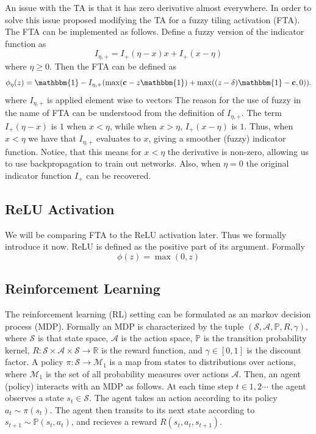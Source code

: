 \documentclass{article}
\newcommand{\RR}{\mathbb{R}}
\newcommand{\PP}{\mathbb{P}}
\newcommand{\cS}{\mathcal{S}}
\newcommand{\cA}{\mathcal{A}}
\newcommand{\cM}{\mathcal{M}}
\begin{document}
An issue with the TA is that it has zero derivative almost everywhere.
In order to solve this issue \cite{pan2019fuzzy} proposed modifying the TA for a fuzzy tiling activation (FTA).
The FTA can be implemented as follows.
Define a fuzzy version of the indicator function as
$$I_{\eta, +} = I_+(\eta -x)x + I_+(x - \eta)$$
where $\eta \ge 0$.
Then the FTA can be defined as
$$\phi_\eta(z) = \mathbbm{1} - I_{\eta, +} (\max(\mathbf{c} - z \mathbbm{1}) + \max((z-\delta)\mathbbm{1} - \mathbf{c}, 0)).$$
where $I_{\eta, +}$ is applied element wise to vectors
The reason for the use of fuzzy in the name of FTA can be understood from the definition of $I_{\eta, +}$.
The term $I_+(\eta -x)$ is $1$ when $x < \eta$, while when $x > \eta$, $I_+(x - \eta)$ is $1$.
Thus, when $x < \eta$ we have that $I_{\eta ,+}$ evaluates to $x$, giving a smoother (fuzzy) indicator function.
Notice, that this means for $x < \eta$ the derivative is non-zero, allowing us to use backpropagation to train out networks.
Also, when $\eta = 0$ the original indicator function $I_+$ can be recovered.

\subsection{ReLU Activation}
We will be comparing FTA to the ReLU activation later.
Thus we formally introduce it now.
ReLU is defined as the positive part of its argument. Formally
$$\phi(z) = \max(0, z)$$

\subsection{Reinforcement Learning} \label{sub-sec:reinforcement}
The reinforcement learning (RL) setting can be formulated as an markov decision process (MDP).
Formally an MDP is characterized by the tuple $(\cS, \cA, \PP, R, \gamma)$, where $\cS$ is that state space, $\cA$ is the action space,
$\PP$ is the transition probability kernel, $R: \cS \times \cA \times \cS \to \RR$ is the reward function, and $\gamma \in [0, 1]$ is the discount factor.
A policy $\pi: \cS \to \cM_1$ is a map from states to distributions over actions, where $\cM_1$ is the set of all probability measures over actions $\cA$.
Then, an agent (policy) interacts with an MDP as follows.
At each time step $t \in 1, 2 \cdots$ the agent observes a state $s_t \in \cS$.
The agent takes an action according to its policy $a_t \sim \pi(s_t)$.
The agent then transits to its next state according to $s_{t+1} \sim \PP(s_t, a_t)$, and recieves a reward $R(s_t, a_t, s_{t+1})$.
\end{document}
